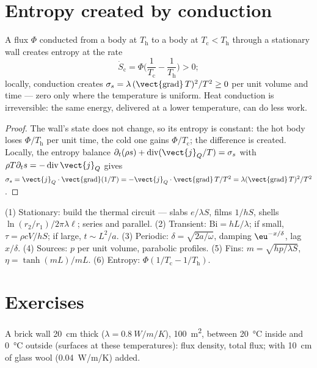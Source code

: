 \section{Entropy created by conduction}

\begin{proposition}\label{prop:b2:heat-conduction:entropy}
A flux $\Phi$ conducted from a body at $T_{\text{h}}$ to a body at
$T_{\text{c}} < T_{\text{h}}$ through a stationary wall creates entropy at
the rate
\[
\dot S_{\text{c}} = \Phi\Big(\frac{1}{T_{\text{c}}} - \frac{1}{T_{\text{h}}}\Big) > 0 ;
\]
locally, conduction creates $\sigma_s = \lambda\,(\vect{\operatorname{grad}}\,T)^2/T^2
\ge 0$ per unit volume and time --- zero only where the temperature is
uniform. Heat conduction is irreversible: the same energy, delivered at
a lower temperature, can do less work.
\end{proposition}

\begin{proof}
The wall's state does not change, so its entropy is constant: the hot
body loses $\Phi/T_{\text{h}}$ per unit time, the cold one gains
$\Phi/T_{\text{c}}$; the difference is created. Locally, the entropy
balance $\partial_t(\rho s) + \operatorname{div}(\vect{j}_Q/T) = \sigma_s$
with $\rho T\partial_t s = -\operatorname{div}\vect{j}_Q$ gives $\sigma_s =
\vect{j}_Q\cdot\vect{\operatorname{grad}}(1/T) = -\vect{j}_Q\cdot
\vect{\operatorname{grad}}\,T/T^2 = \lambda(\vect{\operatorname{grad}}\,T)^2/T^2$.
\end{proof}

\begin{method}\label{meth:b2:heat-conduction:method}
(1) Stationary: build the thermal circuit --- slabs $e/\lambda S$, films
$1/hS$, shells $\ln(r_2/r_1)/2\pi\lambda\ell$; series and parallel.
(2) Transient: $\mathrm{Bi} = hL/\lambda$; if small, $\tau = \rho cV/hS$; if
large, $t \sim L^2/a$. (3) Periodic: $\delta = \sqrt{2a/\omega}$, damping
$\eu^{-x/\delta}$, lag $x/\delta$. (4) Sources: $p$ per unit volume, parabolic
profiles. (5) Fins: $m = \sqrt{hp/\lambda S}$, $\eta = \tanh(mL)/mL$. (6)
Entropy: $\Phi(1/T_{\text{c}} - 1/T_{\text{h}})$.
\end{method}

\section{Exercises}

\begin{exercise}[$\star$]\label{exo:b2:heat-conduction:1}
A brick wall \qty{20}{cm} thick ($\lambda = \qty{0.8}{W/m/K}$), \qty{100}{m^2},
between \qty{20}{\celsius} inside and \qty{0}{\celsius} outside
(surfaces at these temperatures): flux density, total flux; with
\qty{10}{cm} of glass wool (\qty{0.04}{W/m/K}) added.
\end{exercise}

